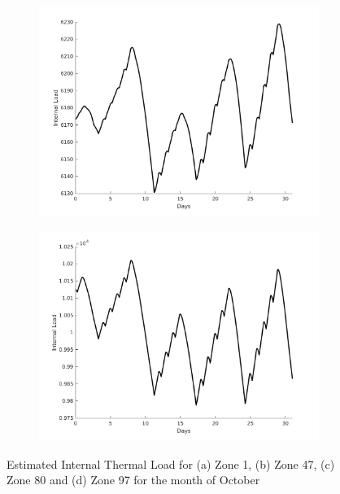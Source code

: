 \begin{figure}[H]
\begin{subfigure}{0.45\textwidth}
\includegraphics[width=\textwidth]{jbs_figures/load_3_10}
\caption{}
\label{load_3_10}
\end{subfigure}
\centering
\begin{subfigure}{0.45\textwidth}
\includegraphics[width=\textwidth]{jbs_figures/load_4_10}
\caption{}
\label{load_4_10}
\end{subfigure}
\caption{Estimated Internal Thermal Load for (a) Zone 1, (b) Zone 47, (c) Zone 80 and (d) Zone 97 for the month of October}
\label{fig:Zone_Int_temperature_oct}
\end{figure}

